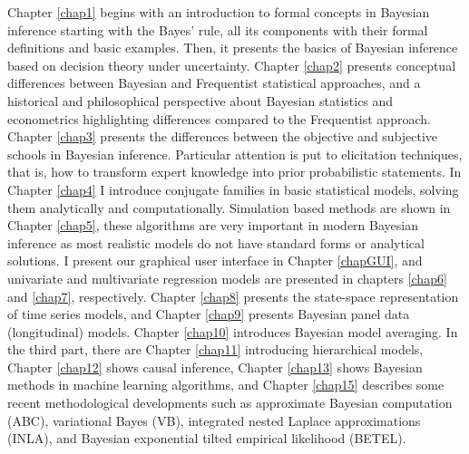 Chapter \ref{chap1} begins with an introduction to formal concepts in Bayesian inference starting with the Bayes’ rule, all its components with their formal definitions and basic examples. Then, it presents the basics of Bayesian inference based on decision theory under uncertainty. Chapter \ref{chap2} presents conceptual differences between Bayesian and Frequentist statistical approaches, and a historical and philosophical perspective about Bayesian statistics and econometrics highlighting differences compared to the Frequentist approach. Chapter \ref{chap3} presents the differences between the objective and subjective schools in Bayesian inference. Particular attention is put to elicitation techniques, that is, how to transform expert knowledge into prior probabilistic statements. In Chapter \ref{chap4} I introduce conjugate families in basic statistical models, solving them analytically and computationally. Simulation based methods are shown in Chapter \ref{chap5}, these algorithms are very important in modern Bayesian inference as most realistic models do not have standard forms or analytical solutions. I present our graphical user interface in Chapter \ref{chapGUI}, and univariate and multivariate regression models are presented in chapters \ref{chap6} and \ref{chap7}, respectively. Chapter \ref{chap8} presents the state-space representation of time series models, and Chapter \ref{chap9} presents Bayesian panel data (longitudinal) models. Chapter \ref{chap10} introduces Bayesian model averaging. In the third part, there are Chapter \ref{chap11} introducing hierarchical models, Chapter \ref{chap12} shows causal inference, Chapter \ref{chap13} shows Bayesian methods in machine learning algorithms, and Chapter \ref{chap15} describes some recent methodological developments such as approximate Bayesian computation (ABC), variational Bayes (VB), integrated nested Laplace approximations (INLA), and Bayesian exponential tilted empirical likelihood (BETEL).

